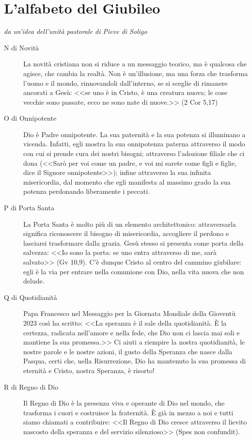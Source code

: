 \section{L'alfabeto del Giubileo}
\begin{center}
\textit{da un'idea dell'unità pastorale di Pieve di Soligo}
\end{center}

\begin{description}
  \item[N di Novità] La novità cristiana non si riduce a un messaggio teorico, ma è qualcosa che agisce, che cambia la realtà. Non è un'illusione, ma una forza che trasforma l'uomo e il mondo, rinnovandoli dall'interno, se si sceglie di rimanere ancorati a Gesù: <<se uno è in Cristo, è una creatura nuova; le cose vecchie sono passate, ecco ne sono nate di nuove.>> (2 Cor 5,17)

  \item[O di Onnipotente] Dio è Padre onnipotente. La sua paternità e la sua potenza si illuminano a vicenda. Infatti, egli mostra la sua onnipotenza paterna attraverso il modo con cui si prende cura dei nostri bisogni; attraverso l'adozione filiale che ci dona (<<Sarò per voi come un padre, e voi mi sarete come figli e figlie, dice il Signore onnipotente>>); infine attraverso la sua infinita misericordia, dal momento che egli manifesta al massimo grado la sua potenza perdonando liberamente i peccati.

  \item[P di Porta Santa] La Porta Santa è molto più di un elemento architettonico: attraversarla significa riconoscere il bisogno di misericordia, accogliere il perdono e lasciarsi trasformare dalla grazia. Gesù stesso si presenta come porta della salvezza: <<Io sono la porta: se uno entra attraverso di me, sarà salvato>> (Gv 10,9). C'è dunque Cristo al centro del cammino giubilare: egli è la via per entrare nella comunione con Dio, nella vita nuova che non delude.

  \item[Q di Quotidianità] Papa Francesco nel Messaggio per la Giornata Mondiale della Gioventù 2023 così ha scritto: <<La speranza è il sale della quotidianità. È la certezza, radicata nell'amore e nella fede, che Dio non ci lascia mai soli e mantiene la sua promessa.>> Ci aiuti a riempire la nostra quotidianità, le nostre parole e le nostre azioni, il gusto della Speranza che nasce dalla Pasqua, certi che, nella Risurrezione, Dio ha mantenuto la sua promessa di eternità e Cristo, nostra Speranza, è risorto!

  \item[R di Regno di Dio] Il Regno di Dio è la presenza viva e operante di Dio nel mondo, che trasforma i cuori e costruisce la fraternità. È già in mezzo a noi e tutti siamo chiamati a contribuire: <<Il Regno di Dio cresce attraverso il lievito nascosto della speranza e del servizio silenzioso>> (Spes non confundit).
\end{description}

